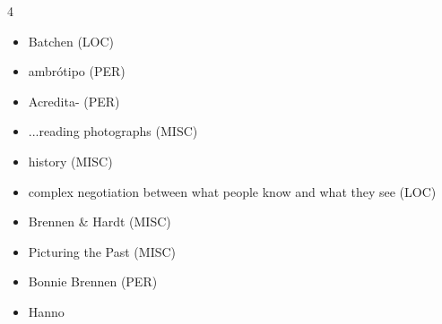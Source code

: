 \documentclass{article}
\begin{document}
\begin{multicols}{4}
\begin{itemize}
\item Batchen (LOC)
\item ambrótipo (PER)
\item Acredita- (PER)
\item ...reading  photographs (MISC)
\item history (MISC)
\item complex 
negotiation between what people know and what they see (LOC)
\item Brennen \& Hardt (MISC)
\item Picturing the Past (MISC)
\item Bonnie Brennen (PER)
\item Hanno 
 


 




\end{itemize}
\end{multicols}
\end{document}
